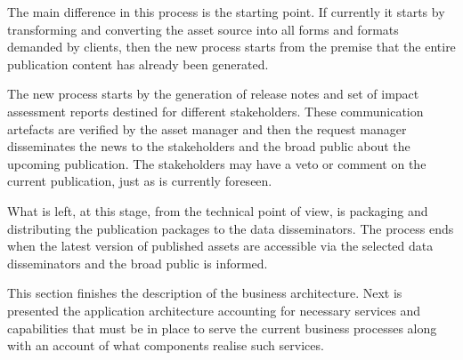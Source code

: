 	The main difference in this process is the starting point. If currently it starts by transforming and converting the asset source into all forms and formats demanded by clients, then the new process starts from the premise that the entire publication content has already been generated. 
	
	The new process starts by the generation of release notes and set of impact assessment reports destined for different stakeholders. These communication artefacts are verified by the asset manager and then the request manager disseminates the news to the stakeholders and the broad public about the upcoming publication. The stakeholders may have a veto or comment on the current publication, just as is currently foreseen.   
	
	What is left, at this stage, from the technical point of view, is packaging and distributing the publication packages to the data disseminators. The process ends when the latest version of published assets are accessible via the selected data disseminators and the broad public is informed. 
	
	This section finishes the description of the business architecture. Next is presented the application architecture accounting for necessary services and capabilities that must be in place to serve the current business processes along with an account of what components realise such services. 
	